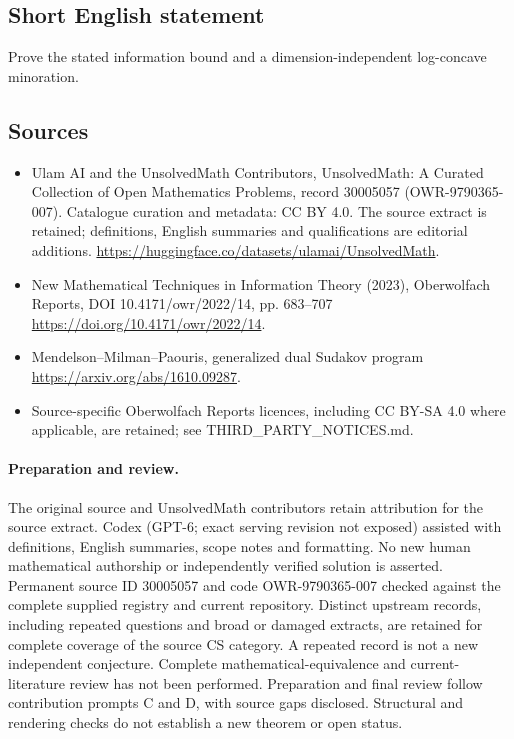 \documentclass[11pt]{article}
\begin{document}
\subsection{Short English statement}
Prove the stated information bound and a dimension-independent log-concave minoration.
\subsection{Sources}
\begin{itemize}
\item[\hypertarget{source:30005057:1}{S1}] Ulam AI and the UnsolvedMath Contributors, UnsolvedMath: A Curated Collection of Open Mathematics Problems, record 30005057 (OWR-9790365-007). Catalogue curation and metadata: CC BY 4.0. The source extract is retained; definitions, English summaries and qualifications are editorial additions.
\url{https://huggingface.co/datasets/ulamai/UnsolvedMath}.
\item[\hypertarget{source:30005057:2}{S2}] New Mathematical Techniques in Information Theory (2023), Oberwolfach Reports, DOI 10.4171/owr/2022/14, pp. 683--707
\url{https://doi.org/10.4171/owr/2022/14}.
\item[\hypertarget{source:30005057:3}{S3}] Mendelson--Milman--Paouris, generalized dual Sudakov program
\url{https://arxiv.org/abs/1610.09287}.
\item Source-specific Oberwolfach Reports licences, including CC BY-SA 4.0 where applicable, are retained; see THIRD\_PARTY\_NOTICES.md.
\end{itemize}
\paragraph{Preparation and review.}
The original source and UnsolvedMath contributors retain attribution for the source extract. Codex (GPT-6; exact serving revision not exposed) assisted with definitions, English summaries, scope notes and formatting. No new human mathematical authorship or independently verified solution is asserted. Permanent source ID 30005057 and code OWR-9790365-007 checked against the complete supplied registry and current repository. Distinct upstream records, including repeated questions and broad or damaged extracts, are retained for complete coverage of the source CS category. A repeated record is not a new independent conjecture. Complete mathematical-equivalence and current-literature review has not been performed. Preparation and final review follow contribution prompts C and D, with source gaps disclosed. Structural and rendering checks do not establish a new theorem or open status.
\label{end:30005057}
\end{document}
